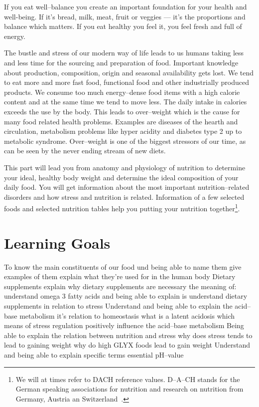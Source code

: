 \documentclass[../main.tex]{subfiles}
\begin{document}
If you eat well--balance you create an important foundation for your health and well-being.
If it's bread, milk, meat, fruit or veggies --- it's the proportions and balance which matters.
If you eat healthy you feel it, you feel fresh and full of energy.

The bustle and stress of our modern way of life leads to us humans taking less and less time for the sourcing and preparation of food.
Important knowledge about production, composition, origin and seasonal availability gets lost.
We tend to eat more and more fast food, functional food and other industrially produced products.
We consume too much energy--dense food items with a high calorie content and at the same time we tend to move less.
The daily intake in calories exceeds the use by the body. This leads to over--weight which is the cause for many food related health problems.
Examples are diseases of the hearth and circulation, metabolism problems like hyper acidity and diabetes type 2 up to metabolic syndrome.
Over--weight is one of the biggest stressors of our time, as can be seen by the never ending stream of new diets.

This part will lead you from anatomy and physiology of nutrition to determine your ideal, healthy body weight and determine the ideal composition of your daily food.
You will get information about the most important nutrition--related disorders and how stress and nutrition is related.
Information of a few selected foods and selected nutrition tables help you putting your nutrition together\footnote{We will at times refer to DACH reference values. D--A--CH stands for the German speaking associations for nutrition and research on nutrition from Germany, Austria an Switzerland~\cite{DACH}.}.


\section{Learning Goals}

\begin{outline}
  \1 To know the main constituents of our food und
  \2 being able to name them
  \2 give examples of them
  \2 explain what they're used for in the human body
  \1 Dietary supplements
  \2 explain why dietary supplements are necessary
  \2 the meaning of:
  \3 understand omega 3 fatty acids and being able to explain is
  \3 understand dietary supplements in relation to stress
  \1 Understand and being able to explain the acid--base metabolism
  \2 it's relation to homeostasis
  \2 what is a latent acidosis
  \2 which means of stress regulation positively influence the acid--base metabolism
  \1 Being able to explain the relation between nutrition and stress
  \2 why does stress tends to lead to gaining weight
  \2 why do high GLYX foods lead to gain weight
  \1 Understand and being able to explain specific terms
  \2 essential
  \2 pH--value
\end{outline}
\end{document}
